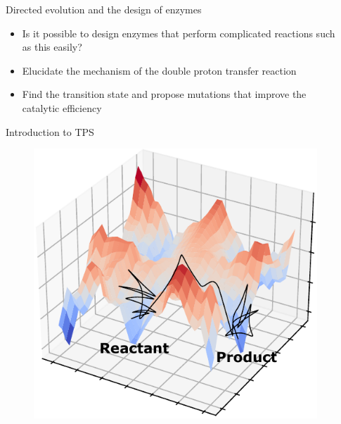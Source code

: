 \documentclass[final]{beamer}
\newlength{\sepwidth}
\newlength{\colwidth}
\newcommand{\separatorcolumn}{\begin{column}{\sepwidth}\end{column}}
\begin{document}
\begin{frame}[t]
\begin{columns}[t]
\separatorcolumn

\begin{column}{\colwidth}

\begin{block}{Directed evolution and the design of enzymes}

    \begin{itemize}
      \item Is it possible to design enzymes that perform complicated reactions such as this easily?
      \item Elucidate the mechanism of the double proton transfer reaction 
      \item Find the transition state and propose mutations that improve the catalytic efficiency
    \end{itemize}

  \end{block}

  \begin{block}{Introduction to TPS}

    \begin{figure}
    \includegraphics[scale=0.8]{figures/pot-surf.pdf}
    \end{figure}



\end{block}
\end{column}
\end{columns}
\end{frame}
\end{document}

